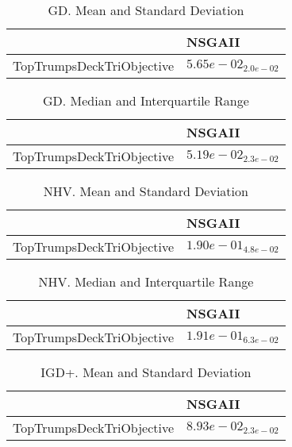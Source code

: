 \documentclass{article}
\begin{document}
\begin{table}
\caption{GD. Mean and Standard Deviation}
\label{table: GD}
\centering
\begin{scriptsize}
\begin{tabular}{ll}
\hline &  NSGAII\\
\hline 
TopTrumpsDeckTriObjective & \cellcolor{gray95}$  5.65e-02_{ 2.0e-02}$ \\
\hline
\end{tabular}
\end{scriptsize}
\end{table}

\begin{table}
\caption{GD. Median and Interquartile Range}
\label{table: GD}
\centering
\begin{scriptsize}
\begin{tabular}{ll}
\hline &  NSGAII\\
\hline 
TopTrumpsDeckTriObjective & \cellcolor{gray95}$  5.19e-02_{ 2.3e-02}$ \\
\hline
\end{tabular}
\end{scriptsize}
\end{table}

\begin{table}
\caption{NHV. Mean and Standard Deviation}
\label{table: NHV}
\centering
\begin{scriptsize}
\begin{tabular}{ll}
\hline &  NSGAII\\
\hline 
TopTrumpsDeckTriObjective & \cellcolor{gray95}$  1.90e-01_{ 4.8e-02}$ \\
\hline
\end{tabular}
\end{scriptsize}
\end{table}

\begin{table}
\caption{NHV. Median and Interquartile Range}
\label{table: NHV}
\centering
\begin{scriptsize}
\begin{tabular}{ll}
\hline &  NSGAII\\
\hline 
TopTrumpsDeckTriObjective & \cellcolor{gray95}$  1.91e-01_{ 6.3e-02}$ \\
\hline
\end{tabular}
\end{scriptsize}
\end{table}

\begin{table}
\caption{IGD+. Mean and Standard Deviation}
\label{table: IGD+}
\centering
\begin{scriptsize}
\begin{tabular}{ll}
\hline &  NSGAII\\
\hline 
TopTrumpsDeckTriObjective & \cellcolor{gray95}$  8.93e-02_{ 2.3e-02}$ \\
\hline
\end{tabular}
\end{scriptsize}
\end{table}
\end{document}

